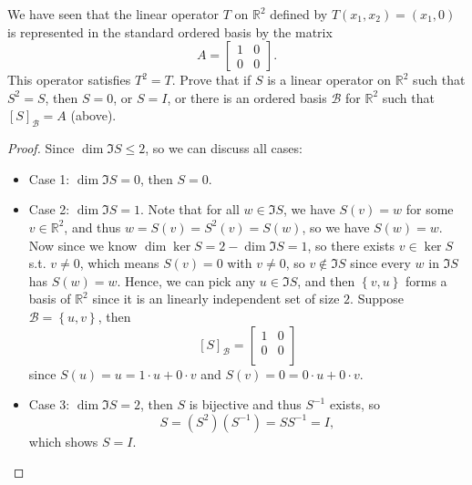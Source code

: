 \begin{problem}
    We have seen that the linear operator \(T\) on \(\mathbb{R}^2\) defined by \(T(x_1,x_2)=(x_1,0)\) is represented in the standard ordered basis by the matrix
    \[
    A=\begin{bmatrix}1 & 0 \\[4pt] 0 & 0 \end{bmatrix}.
    \]
    This operator satisfies \(T^2=T\).  Prove that if \(S\) is a linear operator on \(\mathbb{R}^2\) such that \(S^2=S\), then \(S=0\), or \(S=I\), or there is an ordered basis \(\mathcal{B}\) for \(\mathbb{R}^2\) such that \([S]_{\mathcal{B}}=A\) (above).
\end{problem}
\begin{proof}
    Since \(\dim \Im S \le 2\), so we can discuss all cases: 
    \begin{itemize}
        \item Case 1: \(\dim \Im S = 0\), then \(S = 0\). 
        \item Case 2: \(\dim \Im S = 1\). Note that for all \(w \in \Im S\), we have \(S(v) = w\) for some \(v \in \mathbb{R} ^2\), and thus \(w = S(v) = S^2(v) = S(w)\), so we have \(S(w) = w\). Now since we know \(\dim \ker S = 2 - \dim \Im S = 1\), so there exists \(v \in \ker S\) s.t. \(v \neq 0\), which means \(S(v) = 0\) with \(v \neq 0\), so \(v \notin \Im S\) since every \(w\) in \(\Im S\) has \(S(w) = w\). Hence, we can pick any \(u \in \Im S\), and then \(\left\{ v, u \right\} \) forms a basis of \(\mathbb{R} ^2\) since it is an linearly independent set of size \(2\). Suppose \(\mathcal{B}  = \left\{ u, v \right\} \), then 
        \[
            [S]_{\mathcal{B} } = \begin{bmatrix}
                1 & 0  \\
                0 & 0  \\
            \end{bmatrix}
        \] since \(S(u) = u = 1 \cdot u + 0 \cdot v\) and \(S(v) = 0 = 0 \cdot u + 0 \cdot v\).  
        \item Case 3: \(\dim \Im S = 2\), then \(S\) is bijective and thus \(S^{-1} \) exists, so 
        \[
            S = (S^2)\left( S^{-1}  \right) = S S ^{-1} = I,
        \]which shows \(S = I\). 
    \end{itemize} 
\end{proof}

